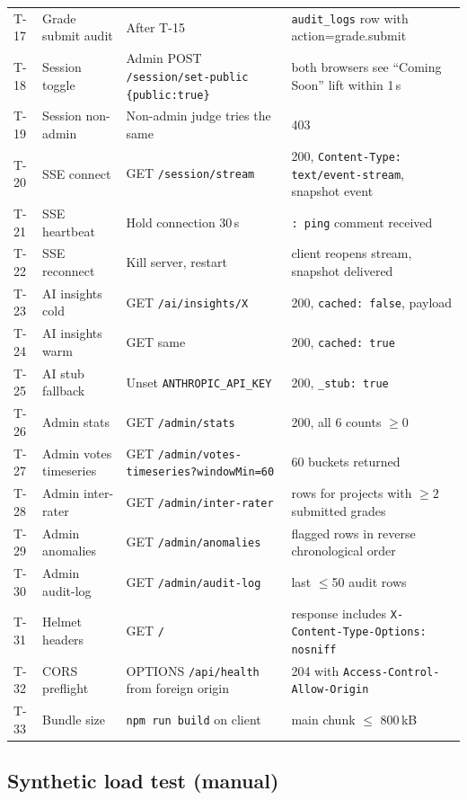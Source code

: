\begin{longtable}{p{}p{}p{}p{}}
  T-17 & Grade submit audit & After T-15 & \texttt{audit\_logs} row with action=grade.submit \\
  T-18 & Session toggle & Admin POST \texttt{/session/set-public \{public:true\}} & both browsers see ``Coming Soon'' lift within 1\,s \\
  T-19 & Session non-admin & Non-admin judge tries the same & 403 \\
  T-20 & SSE connect & GET \texttt{/session/stream} & 200, \texttt{Content-Type: text/event-stream}, snapshot event \\
  T-21 & SSE heartbeat & Hold connection 30\,s & \texttt{: ping} comment received \\
  T-22 & SSE reconnect & Kill server, restart & client reopens stream, snapshot delivered \\
  T-23 & AI insights cold & GET \texttt{/ai/insights/X} & 200, \texttt{cached: false}, payload \\
  T-24 & AI insights warm & GET same & 200, \texttt{cached: true} \\
  T-25 & AI stub fallback & Unset \texttt{ANTHROPIC\_API\_KEY} & 200, \texttt{\_stub: true} \\
  T-26 & Admin stats & GET \texttt{/admin/stats} & 200, all 6 counts $\geq 0$ \\
  T-27 & Admin votes timeseries & GET \texttt{/admin/votes-timeseries?windowMin=60} & 60 buckets returned \\
  T-28 & Admin inter-rater & GET \texttt{/admin/inter-rater} & rows for projects with $\geq 2$ submitted grades \\
  T-29 & Admin anomalies & GET \texttt{/admin/anomalies} & flagged rows in reverse chronological order \\
  T-30 & Admin audit-log & GET \texttt{/admin/audit-log} & last $\leq$50 audit rows \\
  T-31 & Helmet headers & GET \texttt{/} & response includes \texttt{X-Content-Type-Options: nosniff} \\
  T-32 & CORS preflight & OPTIONS \texttt{/api/health} from foreign origin & 204 with \texttt{Access-Control-Allow-Origin} \\
  T-33 & Bundle size & \texttt{npm run build} on client & main chunk $\leq$ 800\,kB \\

  \bottomrule
\end{longtable}

\subsection{Synthetic load test (manual)}

